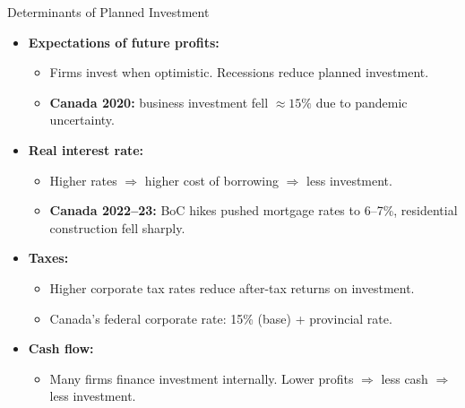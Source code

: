 \documentclass[aspectratio=169]{beamer}
\begin{document}
\begin{frame}{Determinants of Planned Investment}
\transfade
\begin{itemize}[<+->]
  \item \textbf{Expectations of future profits:}
  \begin{itemize}[<+->]
    \item Firms invest when optimistic. Recessions reduce planned investment.
    \item \textbf{Canada 2020:} business investment fell $\approx 15\%$ due to pandemic uncertainty.
  \end{itemize}
  \item \textbf{Real interest rate:}
  \begin{itemize}[<+->]
    \item Higher rates $\Rightarrow$ higher cost of borrowing $\Rightarrow$ less investment.
    \item \textbf{Canada 2022--23:} BoC hikes pushed mortgage rates to 6--7\%, residential construction fell sharply.
  \end{itemize}
  \item \textbf{Taxes:}
  \begin{itemize}[<+->]
    \item Higher corporate tax rates reduce after-tax returns on investment.
    \item Canada's federal corporate rate: 15\% (base) + provincial rate.
  \end{itemize}
  \item \textbf{Cash flow:}
  \begin{itemize}[<+->]
    \item Many firms finance investment internally. Lower profits $\Rightarrow$ less cash $\Rightarrow$ less investment.
  \end{itemize}
\end{itemize}
\end{frame}
\end{document}
